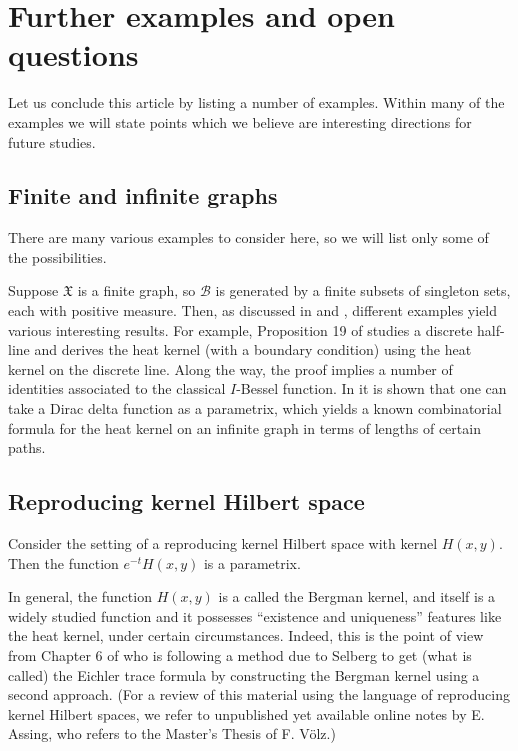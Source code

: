 \documentclass[11pt,reqno]{amsart}
\theoremstyle{remark}
\theoremstyle{definition}
\numberwithin{theorem}{section} \numberwithin{equation}{section}
\newcommand{\X}{\mathfrak{X}}
\begin{document}
\section{Further examples and open questions}

Let us conclude this article by listing a number of examples.  Within many of the examples
we will state points which we believe are interesting directions for future studies.

\subsection{Finite and infinite graphs}
There are many various examples to consider here, so we will list only some of the possibilities.

Suppose $\X$ is a finite graph, so $\mathcal{B}$ is generated by a finite subsets of singleton sets,
each with positive measure.  Then, as discussed in \cite{CJKS24} and \cite{JKS26}, different examples
yield various interesting results.  For example, Proposition 19 of \cite{CJKS24} studies a discrete
half-line and derives the heat kernel (with a boundary condition) using the heat kernel on the discrete line.
Along the way, the proof implies a number of identities associated to the classical
$I$-Bessel function.  In \cite{JKS26} it is shown that one can take a Dirac
delta function as a parametrix, which yields a known combinatorial formula for the heat kernel on an infinite
graph in terms of lengths of certain paths.


\subsection{Reproducing kernel Hilbert space}
Consider the setting of a reproducing kernel Hilbert space with kernel $H(x,y)$.  Then
the function $e^{-t}H(x,y)$ is a parametrix.

In general, the function $H(x,y)$ is a
called the Bergman kernel, and itself is a widely studied function and it possesses
``existence and uniqueness'' features like the heat kernel, under certain circumstances.
Indeed, this is the point of view from Chapter 6 of \cite{Mi06} who is following a method
due to Selberg to get (what is called) the Eichler trace formula by constructing the Bergman kernel
using a second approach.    (For a review of this material using
the language of reproducing kernel Hilbert spaces, we refer to unpublished yet available
online notes by E. Assing, who refers to the Master's Thesis of F. V\"olz.)
\end{document}
